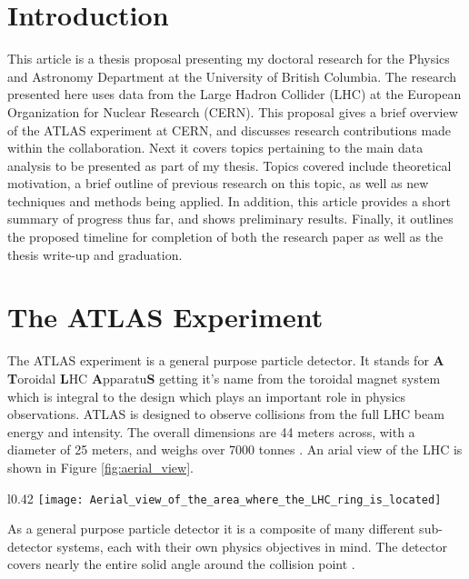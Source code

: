 \documentclass[12pt]{article}
\begin{document}

\newpage
\section{Introduction}

This article is a thesis proposal presenting my doctoral research for the
Physics and Astronomy Department at the University of British Columbia. The
research presented here uses data from the Large Hadron Collider (LHC) at the
European Organization for Nuclear Research (CERN). This proposal gives a brief
overview of the ATLAS experiment at CERN, and discusses research contributions
made within the collaboration. Next it covers topics pertaining to the main
data analysis to be presented as part of my thesis. Topics covered include
theoretical motivation, a brief outline of previous research on this topic, as
well as new techniques and methods being applied. In addition, this article
provides a short summary of progress thus far, and shows preliminary results.
Finally, it outlines the proposed timeline for completion of both the
research paper as well as the thesis write-up and graduation.


\section{The ATLAS Experiment}
The ATLAS experiment is a general purpose particle detector. It stands for
\textbf{A} \textbf{T}oroidal \textbf{L}HC \textbf{A}pparatu\textbf{S} getting
it's name from the toroidal magnet system which is integral to the design which
plays an important role in physics observations. ATLAS is designed to observe
collisions from the full LHC beam energy and intensity. The overall dimensions
are 44 meters across, with a diameter of 25 meters, and weighs over 7000 tonnes
\cite{Aad_2024}. An arial view of the LHC is shown in Figure
\ref{fig:aerial_view}.
 \newline \vspace{-4mm}
\begin{wrapfigure}{l}{0.42\textwidth}
    \centering
    \texttt{[image: Aerial\_view\_of\_the\_area\_where\_the\_LHC\_ring\_is\_located]}
    \caption{Aerial view of the LHC, located in Geneva, Switzerland.}
    \label{fig:aerial_view}
\end{wrapfigure} As a general purpose particle detector it is a composite of
many different sub-detector systems, each with their own physics objectives in
mind. The detector covers nearly the entire solid angle around the
collision point \cite{The_ATLAS_Collaboration_2008}.
\end{document}
